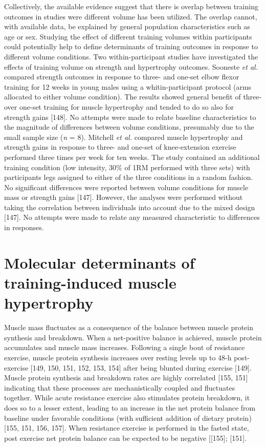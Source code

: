 \documentclass[twoside,10pt]{gihclass} %
\begin{document}
Collectively, the available evidence suggest that there is overlap between training outcomes in studies were different volume has been utilized.
The overlap cannot, with available data, be explained by general population characteristics such as age or sex.
Studying the effect of different training volumes within participants could potentially help to define determinants of training outcomes in response to different volume conditions.
Two within-participant studies have investigated the effects of training volume on strength and hypertrophy outcomes.
Sooneste \emph{et al.} compared strength outcomes in response to three- and one-set elbow flexor training for 12 weeks in young males using a whitin-participant protocol (arms allocated to either volume condition).
The results showed general benefit of three- over one-set training for muscle hypertrophy and tended to do so also for strength gains {[}148{]}.
No attempts were made to relate baseline characteristics to the magnitude of differences between volume conditions, presumably due to the small sample size (\emph{n} = 8).
Mitchell \emph{et al.} compared muscle hypertrophy and strength gains in response to three- and one-set of knee-extension exercise performed three times per week for ten weeks.
The study contained an additional training condition (low intensity, 30\% of 1RM performed with three sets) with participants legs assigned to either of the three conditions in a random fashion.
No significant differences were reported between volume conditions for muscle mass or strength gains {[}147{]}.
However, the analyses were performed without taking the correlation between individuals into account due to the mixed design {[}147{]}.
No attempts were made to relate any measured characteristic to differences in responses.

\hypertarget{molecular-determinants-of-training-induced-muscle-hypertrophy}{%
\section{Molecular determinants of training-induced muscle hypertrophy}\label{molecular-determinants-of-training-induced-muscle-hypertrophy}}

Muscle mass fluctuates as a consequence of the balance between muscle protein synthesis and breakdown. When a net-positive balance is achieved, muscle protein accumulates and muscle mass increases.
Following a single bout of resistance exercise, muscle protein synthesis increases
over resting levels up to 48-h post-exercise
{[}149, 150, 151, 152, 153, 154{]}
after being blunted during exercise
{[}149{]}.
Muscle protein synthesis and breakdown rates are highly correlated
{[}155, 151{]}
indicating that these processes are mechanistically coupled and fluctuates together.
While acute resistance exercise also stimulates protein breakdown, it does so to a lesser extent, leading to an increase in the net protein balance from baseline under favorable conditions (with sufficient addition of dietary protein)
{[}155, 151, 156, 157{]}.
When resistance exercise is performed in the fasted state, post exercise net protein balance can be expected to be negative
{[}{[}155{]};
{[}151{]}.
\end{document}
